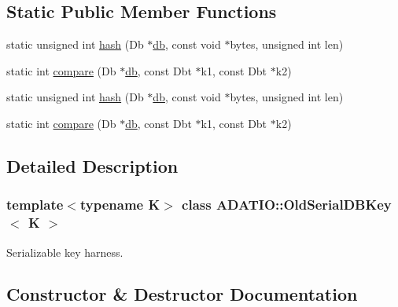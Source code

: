 \subsection*{Static Public Member Functions}
\begin{DoxyCompactItemize}
\item 
static unsigned int \mbox{\hyperlink{classADATIO_1_1OldSerialDBKey_a35cfd22922a3cd984d6a68cce998565f}{hash}} (Db $\ast$\mbox{\hyperlink{structdb}{db}}, const void $\ast$bytes, unsigned int len)
\item 
static int \mbox{\hyperlink{classADATIO_1_1OldSerialDBKey_a9f6e624dc2c8940397632286dbab1f61}{compare}} (Db $\ast$\mbox{\hyperlink{structdb}{db}}, const Dbt $\ast$k1, const Dbt $\ast$k2)
\item 
static unsigned int \mbox{\hyperlink{classADATIO_1_1OldSerialDBKey_a35cfd22922a3cd984d6a68cce998565f}{hash}} (Db $\ast$\mbox{\hyperlink{structdb}{db}}, const void $\ast$bytes, unsigned int len)
\item 
static int \mbox{\hyperlink{classADATIO_1_1OldSerialDBKey_a9f6e624dc2c8940397632286dbab1f61}{compare}} (Db $\ast$\mbox{\hyperlink{structdb}{db}}, const Dbt $\ast$k1, const Dbt $\ast$k2)
\end{DoxyCompactItemize}


\subsection{Detailed Description}
\subsubsection*{template$<$typename K$>$\newline
class A\+D\+A\+T\+I\+O\+::\+Old\+Serial\+D\+B\+Key$<$ K $>$}

Serializable key harness. 



\subsection{Constructor \& Destructor Documentation}
\mbox{\label{classADATIO_1_1OldSerialDBKey_a4ebea5cb376cbc7ce81524c8b9723923}} 
